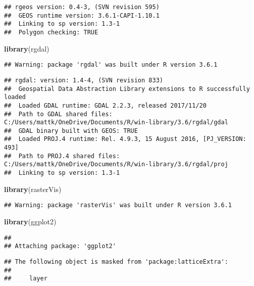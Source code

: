 \documentclass[]{article}
\newenvironment{Shaded}{\begin{snugshade}}{\end{snugshade}}
\newcommand{\KeywordTok}[1]{\textcolor[rgb]{0.13,0.29,0.53}{\textbf{#1}}}
\newcommand{\NormalTok}[1]{#1}
\begin{document}
\begin{verbatim}
## rgeos version: 0.4-3, (SVN revision 595)
##  GEOS runtime version: 3.6.1-CAPI-1.10.1 
##  Linking to sp version: 1.3-1 
##  Polygon checking: TRUE
\end{verbatim}

\begin{Shaded}
\begin{Highlighting}[]
\KeywordTok{library}\NormalTok{(rgdal)}
\end{Highlighting}
\end{Shaded}

\begin{verbatim}
## Warning: package 'rgdal' was built under R version 3.6.1
\end{verbatim}

\begin{verbatim}
## rgdal: version: 1.4-4, (SVN revision 833)
##  Geospatial Data Abstraction Library extensions to R successfully loaded
##  Loaded GDAL runtime: GDAL 2.2.3, released 2017/11/20
##  Path to GDAL shared files: C:/Users/mattk/OneDrive/Documents/R/win-library/3.6/rgdal/gdal
##  GDAL binary built with GEOS: TRUE 
##  Loaded PROJ.4 runtime: Rel. 4.9.3, 15 August 2016, [PJ_VERSION: 493]
##  Path to PROJ.4 shared files: C:/Users/mattk/OneDrive/Documents/R/win-library/3.6/rgdal/proj
##  Linking to sp version: 1.3-1
\end{verbatim}

\begin{Shaded}
\begin{Highlighting}[]
\KeywordTok{library}\NormalTok{(rasterVis)}
\end{Highlighting}
\end{Shaded}

\begin{verbatim}
## Warning: package 'rasterVis' was built under R version 3.6.1
\end{verbatim}

\begin{Shaded}
\begin{Highlighting}[]
\KeywordTok{library}\NormalTok{(ggplot2)}
\end{Highlighting}
\end{Shaded}

\begin{verbatim}
## 
## Attaching package: 'ggplot2'
\end{verbatim}

\begin{verbatim}
## The following object is masked from 'package:latticeExtra':
## 
##     layer
\end{verbatim}
\end{document}
